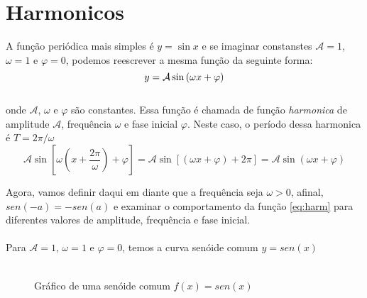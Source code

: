\chapter{Harmonicos}
\label{cap:harm}
A função periódica mais simples é $y = \sin{x}$ e se imaginar constanstes $\mathcal{A} = 1$,
$\omega = 1$ e $\varphi = 0$, podemos reescrever a mesma função da seguinte forma:
\begin{equation}
\label{eq:harm}
    \mbox{$y = \mathcal{A}\sin{(\omega x + \varphi)}$}
\end{equation} 
\\
onde $\mathcal{A}$, $\omega$ e $\varphi$ são constantes. Essa função é chamada de função 
\textit{harmonica} de amplitude $\mathcal{A}$, frequência $\omega$ e fase
inicial $\varphi$. Neste caso, o período dessa harmonica é $T = 2\pi / \omega$
\begin{equation}
\label{harm_ex}
    \mathcal{A}\sin{\left[\omega\left(x+\dfrac{2\pi}{\omega}\right) + \varphi\right]} = \mathcal{A}\sin{[(\omega x + \varphi) + 2\pi]} = \mathcal{A}\sin{(\omega x + \varphi)}
\end{equation}


Agora, vamos definir daqui em diante que a frequência seja $\omega > 0$, afinal, 
\mbox{$sen(-a) = - sen (a)$} e examinar o comportamento da função \ref{eq:harm} para 
diferentes valores de amplitude, frequência e fase inicial.
\\
\\


Para $\mathcal{A}=1$, $\omega = 1$ e $\varphi = 0$, temos a curva senóide comum $y = sen(x)$\\
\\

\begin{figure}[H]
    \caption{Gráfico de uma senóide comum $f(x) = sen(x)$}
    \label{fig:senoide}
\end{figure}

